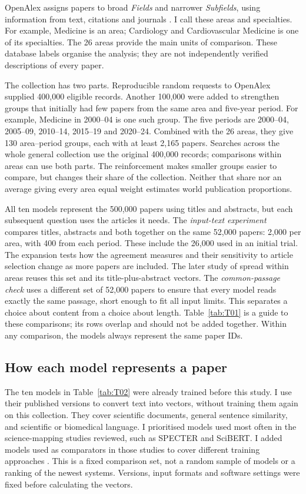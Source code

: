 \documentclass[12pt]{article}
\begin{document}
OpenAlex assigns papers to broad \emph{Fields} and narrower \emph{Subfields}, using information from text, citations and journals \citep{openalex2026topics}. I call these areas and specialties. For example, Medicine is an area; Cardiology and Cardiovascular Medicine is one of its specialties. The 26 areas provide the main units of comparison. These database labels organise the analysis; they are not independently verified descriptions of every paper.

The collection has two parts. Reproducible random requests to OpenAlex supplied 400,000 eligible records. Another 100,000 were added to strengthen groups that initially had few papers from the same area and five-year period. For example, Medicine in 2000--04 is one such group. The five periods are 2000--04, 2005--09, 2010--14, 2015--19 and 2020--24. Combined with the 26 areas, they give 130 area--period groups, each with at least 2,165 papers. Searches across the whole general collection use the original 400,000 records; comparisons within areas can use both parts. The reinforcement makes smaller groups easier to compare, but changes their share of the collection. Neither that share nor an average giving every area equal weight estimates world publication proportions.

All ten models represent the 500,000 papers using titles and abstracts, but each subsequent question uses the articles it needs. The \emph{input-text experiment} compares titles, abstracts and both together on the same 52,000 papers: 2,000 per area, with 400 from each period. These include the 26,000 used in an initial trial. The expansion tests how the agreement measures and their sensitivity to article selection change as more papers are included. The later study of spread within areas reuses this set and its title-plus-abstract vectors. The \emph{common-passage check} uses a different set of 52,000 papers to ensure that every model reads exactly the same passage, short enough to fit all input limits. This separates a choice about content from a choice about length. Table~\ref{tab:T01} is a guide to these comparisons; its rows overlap and should not be added together. Within any comparison, the models always represent the same paper IDs.


\subsection{How each model represents a paper}
The ten models in Table~\ref{tab:T02} were already trained before this study. I use their published versions to convert text into vectors, without training them again on this collection. They cover scientific documents, general sentence similarity, and scientific or biomedical language. I prioritised models used most often in the science-mapping studies reviewed, such as SPECTER and SciBERT. I added models used as comparators in those studies to cover different training approaches \citep{refbe130e2973,refc0e2cc29e0,ref07e33b3339}. This is a fixed comparison set, not a random sample of models or a ranking of the newest systems. Versions, input formats and software settings were fixed before calculating the vectors.
\end{document}
